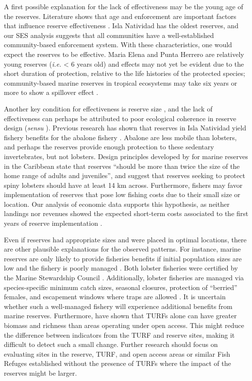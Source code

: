 \documentclass{frontiersSCNS}
\begin{document}
A first possible explanation for the lack of effectiveness may be the
young age of the reserves. Literature shows that age and enforcement are
important factors that influence reserve effectiveness
\citep{edgar_2014-UO,babcock_2010}. Isla Natividad has the oldest
reserves, and our SES analysis suggests that all communities have a
well-established community-based enforcement system. With these
characteristics, one would expect the reserves to be effective. Maria
Elena and Punta Herrero are relatively young reserves (\emph{i.e.}
\textless{} 6 years old) and effects may not yet be evident due to the
short duration of protection, relative to the life histories of the
protected species; community-based marine reserves in tropical
ecosystems may take six years or more to show a spillover effect
\citep{dasilva_2015-zX}.

Another key condition for effectiveness is reserve size
\citep{edgar_2014-UO}, and the lack of effectiveness can perhaps be
attributed to poor ecological coherence in reserve design (\emph{sensu}
\citet{rees_2018}). Previous research has shown that reserves in Isla
Natividad yield fishery benefits for the abalone fishery
\citep{rossetto_2015-V0}. Abalone are less mobile than lobsters, and
perhaps the reserves provide enough protection to these sedentary
invertebrates, but not lobsters. Design principles developed by
\citet{green_2017} for marine reserves in the Caribbean state that
reserves ``should be more than twice the size of the home range of
adults and juveniles'', and suggest that reserves seeking to protect
spiny lobsters should have at least 14 km across. Furthermore, fishers
may favor implementation of reserves that pose low fishing costs due to
their small size or location. Our analysis of economic data supports
this hypothesis, as neither landings nor revenues showed the expected
short-term costs associated to the first years of reserve implementation
\citep{ovando_2016-Wg}.

Even if reserves had appropriate sizes and were placed in optimal
locations, there are other plausible explanations for the observed
patterns. For instance, marine reserves are only likely to provide
fisheries benefits if initial population sizes are low and the fishery
is poorly managed \citep{hilborn_2004,hilborn_2006}. Both lobster
fisheries were certified by the Marine Stewardship Council
\citep{prezramrez_2016-J1}. Additionally, lobster fisheries are managed
via species-specific minimum catch sizes, seasonal closures, protection
of ``berried'' females, and escapement windows where traps are allowed
\citep{dof_website_1993}. It is uncertain whether such a well-managed
fishery will experience additional benefits from marine reserves.
Furthermore, \citet{gelcich_2008} have shown that TURFs alone can have
greater biomass and richness than areas operating under open access.
This might reduce the difference between indicators from the TURF and
reserve sites, making it difficult to detect such a small change.
Further research should focus on evaluating sites in the reserve, TURF,
and open access areas or similar Fish Refuges established without the
presence of TURFs where the impact of the reserves might be larger.
\end{document}
